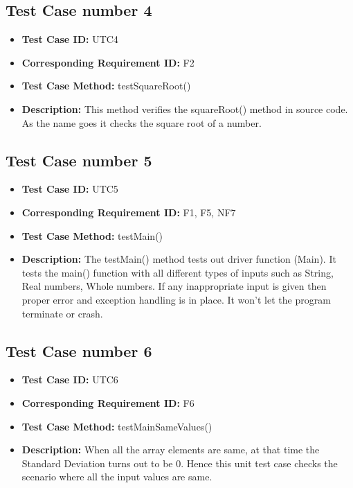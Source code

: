 \documentclass[12pt,a4paper]{report}
\begin{document}
\subsection*{Test Case number 4}
    \begin{itemize}
        \item \textbf{Test Case ID: } UTC4
        \item \textbf{Corresponding Requirement ID: } F2
        \item \textbf{Test Case Method: } testSquareRoot()
        \item \textbf{Description: } This method verifies the squareRoot() method in source code. As the name goes it checks the square root of a number. 
    \end{itemize}

\subsection*{Test Case number 5}
    \begin{itemize}
        \item \textbf{Test Case ID: } UTC5
        \item \textbf{Corresponding Requirement ID: } F1, F5, NF7
        \item \textbf{Test Case Method: } testMain()
        \item \textbf{Description: } The testMain() method tests out driver function (Main). It tests the main() function with all different types of inputs such as String, Real numbers, Whole numbers. If any inappropriate input is given then proper error and exception handling is in place. It won't let the program terminate or crash. 
    \end{itemize}
    
\subsection*{Test Case number 6}
    \begin{itemize}
        \item \textbf{Test Case ID: } UTC6
        \item \textbf{Corresponding Requirement ID: } F6
        \item \textbf{Test Case Method: } testMainSameValues()
        \item \textbf{Description: } When all the array elements are same, at that time the Standard Deviation turns out to be 0. Hence this unit test case checks the scenario where all the input values are same. 
    \end{itemize}
    
\end{document}
